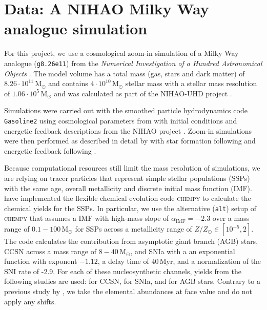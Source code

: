 \documentclass[fleqn,usenatbib]{mnras}
\begin{document}
\section{Data: A NIHAO Milky Way analogue simulation} \label{sec:data}

For this project, we use a cosmological zoom-in simulation of a Milky Way analogue (\texttt{g8.26e11}) from the \textit{Numerical Investigation of a Hundred Astronomical Objects} \citep[NIHAO,][]{Wang2015}. The model volume has a total mass (gas, stars and dark matter) of $8.26 \cdot 10^{11}\,\mathrm{M_\odot}$ and contains $4 \cdot 10^{10}\,\mathrm{M_\odot}$ stellar mass with a stellar mass resolution of $1.06 \cdot 10^{5}\,\mathrm{M_\odot}$ \citep{Buck2021} and was calculated as part of the NIHAO-UHD project \citep{Buck2020b}.

Simulations were carried out with the smoothed particle hydrodynamics code \texttt{Gasoline2} \citep{Wadsley2017} using cosmological parameters from \citet{Planck2014} with initial conditions and energetic feedback descriptions from the NIHAO project \citep{Wang2015}. Zoom-in simulations were then performed as described in detail by \citet{Buck2021} with star formation following \citet{Stinson2006} and energetic feedback following \citet{Stinson2013}.

Because computational resources still limit the mass resolution of simulations, we are relying on tracer particles that represent simple stellar populations (SSPs) with the same age, overall metallicity and discrete initial mass function (IMF). \citet{Buck2021} have implemented the flexible chemical evolution code \textsc{chempy} \citep{Rybizki2017} to calculate the chemical yields for the SSPs. In particular, we use the alternative (\texttt{alt}) setup of \textsc{chempy} that assumes a \citet{Chabrier2003} IMF with high-mass slope of $\alpha_\text{IMF} = -2.3$ over a mass range of $0.1-100\,\mathrm{M_\odot}$ for SSPs across a metallicity range of $Z/Z_\odot \in [10^{-5},2]$. The code calculates the contribution from asymptotic giant branch (AGB) stars, CCSN across a mass range of $8-40\,\mathrm{M_\odot}$, and SNIa with a an exponential function with exponent $-1.12$, a delay time of $40\,\mathrm{Myr}$, and a normalization of the SNI rate of -2.9. For each of these nucleosynthetic channels, yields from the following studies are used: \citet{Limongi2018} for CCSN, \citet{Seitenzahl2013} for SNIa, and \citet{Karakas2016} for AGB stars. Contrary to a previous study by \citet{Buder2024}, we take the elemental abundances at face value and do not apply any shifts.
\end{document}
